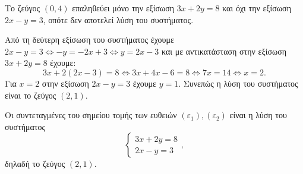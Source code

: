 \begin{alist}
\item Το ζεύγος $(0, 4)$ επαληθεύει μόνο την εξίσωση $3x + 2y = 8$ και όχι την εξίσωση $2x - y = 3$, οπότε δεν αποτελεί λύση του συστήματος.
\item Από τη δεύτερη εξίσωση του συστήματος έχουμε $2x - y = 3 \Leftrightarrow -y = -2x + 3 \Leftrightarrow y = 2x - 3$ και με αντικατάσταση στην εξίσωση $3x + 2y = 8$ έχουμε:
\[3x + 2(2x - 3) = 8 \Leftrightarrow 3x + 4x - 6 = 8 \Leftrightarrow 7x = 14 \Leftrightarrow x = 2.\]
Για $x = 2$ στην εξίσωση $2x - y = 3$ έχουμε $y = 1$.
Συνεπώς η λύση του συστήματος είναι το ζεύγος $(2, 1)$.
\item Οι συντεταγμένες του σημείου τομής των ευθειών $(\varepsilon_1), (\varepsilon_2)$ είναι η λύση του συστήματος
\[\begin{cases} 3x + 2y = 8 \\ 2x - y = 3 \end{cases},\]
δηλαδή το ζεύγος $(2, 1)$.
\end{alist}

